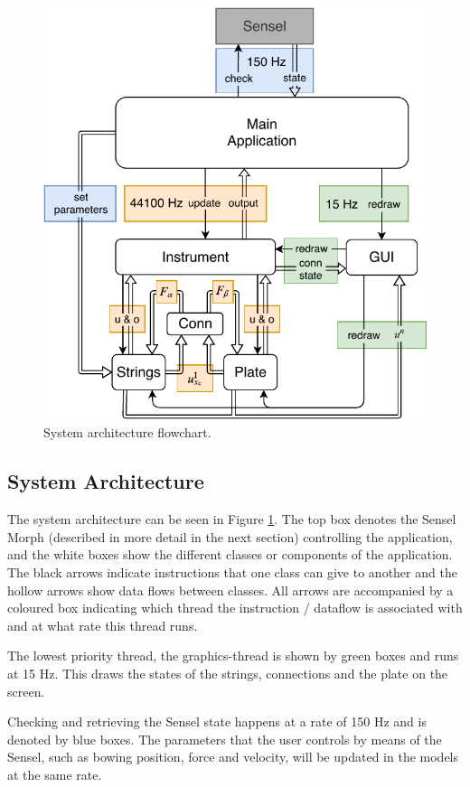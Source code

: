 \documentclass{article}
\begin{document}
\begin{figure}[h]
\centering
\includegraphics[width=1.0\columnwidth]{JUCE.pdf}
\caption{System architecture flowchart. \label{fig:flowchart}}
\end{figure}

\subsection{System Architecture}
The system architecture can be seen in Figure \ref{fig:flowchart}. The top box denotes the Sensel Morph (described in more detail in the next section) controlling the application, and the white boxes show the different classes or components of the application. The black arrows indicate instructions that one class can give to another and the hollow arrows show data flows between classes. All arrows are accompanied by a coloured box indicating which thread the instruction / dataflow is associated with and at what rate this thread runs.

The lowest priority thread, the graphics-thread is shown by green boxes and runs at 15 Hz. This draws the states of the strings, connections and the plate on the screen.

Checking and retrieving the Sensel state happens at a rate of 150 Hz and is denoted by blue boxes. The parameters that the user controls by means of the Sensel, such as bowing position, force and velocity, will be updated in the models at the same rate.
\end{document}
